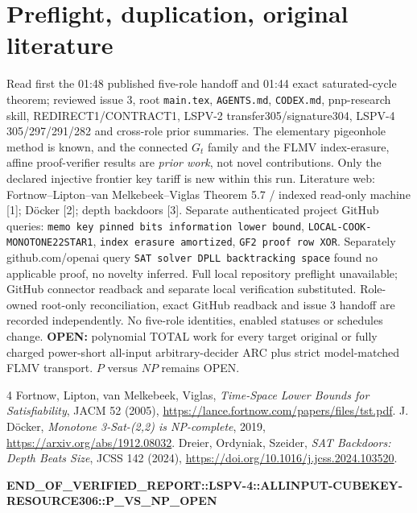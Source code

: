 \documentclass[10pt]{article}
\begin{document}
\section{Preflight, duplication, original literature}
Read first the 01:48 published five-role handoff and 01:44 exact saturated-cycle theorem; reviewed issue 3, root \texttt{main.tex}, \texttt{AGENTS.md}, \texttt{CODEX.md}, pnp-research skill, REDIRECT1/CONTRACT1, LSPV-2 transfer305/signature304, LSPV-4 305/297/291/282 and cross-role prior summaries. The elementary pigeonhole method is known, and the connected $G_t$ family and the FLMV index-erasure, affine proof-verifier results are \emph{prior work}, not novel contributions. Only the declared injective frontier key tariff is new within this run. Literature web: Fortnow--Lipton--van Melkebeek--Viglas Theorem 5.7 / indexed read-only machine [1]; D\"ocker [2]; depth backdoors [3]. Separate authenticated project GitHub queries: \texttt{memo key pinned bits information lower bound}, \texttt{LOCAL-COOK-MONOTONE22STAR1}, \texttt{index erasure amortized}, \texttt{GF2 proof row XOR}. Separately github.com/openai query \texttt{SAT solver DPLL backtracking space} found no applicable proof, no novelty inferred. Full local repository preflight unavailable; GitHub connector readback and separate local verification substituted. Role-owned root-only reconciliation, exact GitHub readback and issue 3 handoff are recorded independently. No five-role identities, enabled statuses or schedules change.
\noindent\textbf{OPEN:} polynomial TOTAL work for every target original or fully charged power-short all-input arbitrary-decider ARC plus strict model-matched FLMV transport. $P$ versus $NP$ remains OPEN.
\begin{thebibliography}{4}
 Fortnow, Lipton, van Melkebeek, Viglas, \emph{Time-Space Lower Bounds for Satisfiability}, JACM 52 (2005), \url{https://lance.fortnow.com/papers/files/tst.pdf}.
 J. D\"ocker, \emph{Monotone 3-Sat-(2,2) is NP-complete}, 2019, \url{https://arxiv.org/abs/1912.08032}.
 Dreier, Ordyniak, Szeider, \emph{SAT Backdoors: Depth Beats Size}, JCSS 142 (2024), \url{https://doi.org/10.1016/j.jcss.2024.103520}.
\end{thebibliography}
\noindent\textbf{END\_OF\_VERIFIED\_REPORT::LSPV-4::ALLINPUT-CUBEKEY-RESOURCE306::P\_VS\_NP\_OPEN}
\end{document}
